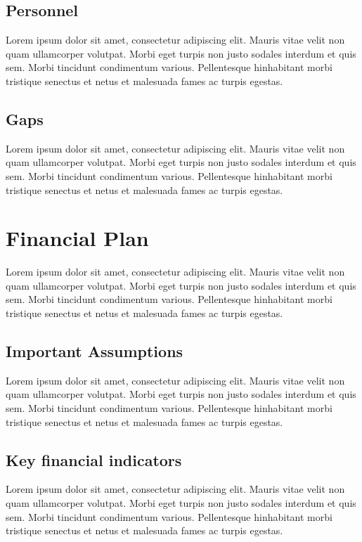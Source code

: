 \documentclass[11pt]{article}
\begin{document}
\subsection{Personnel}
Lorem ipsum dolor sit amet, consectetur adipiscing elit. Mauris vitae velit
non quam ullamcorper volutpat. Morbi eget turpis non justo sodales interdum
et quis sem. Morbi tincidunt condimentum various. Pellentesque hinhabitant morbi
tristique senectus et netus et malesuada fames ac turpis egestas.\newline
\subsection{Gaps}
Lorem ipsum dolor sit amet, consectetur adipiscing elit. Mauris vitae velit
non quam ullamcorper volutpat. Morbi eget turpis non justo sodales interdum
et quis sem. Morbi tincidunt condimentum various. Pellentesque hinhabitant morbi
tristique senectus et netus et malesuada fames ac turpis egestas.\newline
\pagebreak

\section{Financial Plan}
Lorem ipsum dolor sit amet, consectetur adipiscing elit. Mauris vitae velit
non quam ullamcorper volutpat. Morbi eget turpis non justo sodales interdum
et quis sem. Morbi tincidunt condimentum various. Pellentesque hinhabitant morbi
tristique senectus et netus et malesuada fames ac turpis egestas.\newline
\subsection{Important Assumptions}
Lorem ipsum dolor sit amet, consectetur adipiscing elit. Mauris vitae velit
non quam ullamcorper volutpat. Morbi eget turpis non justo sodales interdum
et quis sem. Morbi tincidunt condimentum various. Pellentesque hinhabitant morbi
tristique senectus et netus et malesuada fames ac turpis egestas.\newline
\subsection{Key financial indicators}
Lorem ipsum dolor sit amet, consectetur adipiscing elit. Mauris vitae velit
non quam ullamcorper volutpat. Morbi eget turpis non justo sodales interdum
et quis sem. Morbi tincidunt condimentum various. Pellentesque hinhabitant morbi
tristique senectus et netus et malesuada fames ac turpis egestas.\newline
\end{document}
